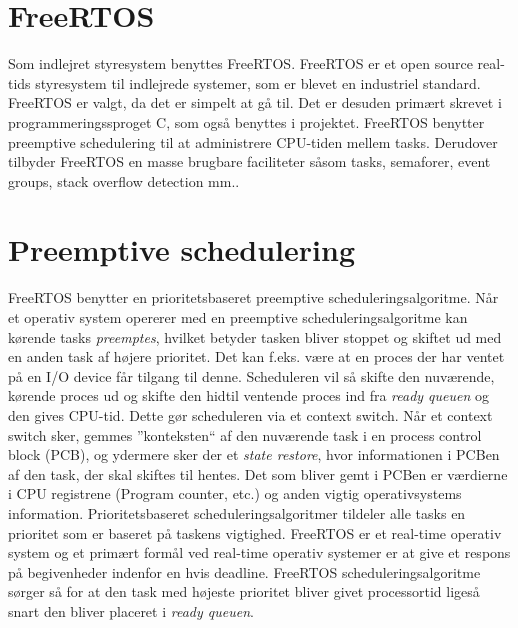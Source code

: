 \section{FreeRTOS}
Som indlejret styresystem benyttes FreeRTOS. 
FreeRTOS er et open source real-tids styresystem til indlejrede systemer, som er blevet en industriel standard\cite{FreeRTOSfundamentals}. 
FreeRTOS er valgt, da det er simpelt at gå til. 
Det er desuden primært skrevet i programmeringssproget C, som også benyttes i projektet. 
FreeRTOS benytter preemptive schedulering til at administrere CPU-tiden mellem tasks.
Derudover tilbyder FreeRTOS en masse brugbare faciliteter såsom tasks, semaforer, event groups, stack overflow detection mm.\cite[Features Overview]{FreeRTOSfundamentals}.

\section{Preemptive schedulering}
FreeRTOS benytter en prioritetsbaseret preemptive scheduleringsalgoritme.
Når et operativ system opererer med en preemptive scheduleringsalgoritme kan kørende tasks \textit{preemptes}, hvilket betyder tasken bliver stoppet og skiftet ud med en anden task af højere prioritet.\newline
Det kan f.eks. være at en proces der har ventet på en I/O device får tilgang til denne.
Scheduleren vil så skifte den nuværende, kørende proces ud og skifte den hidtil ventende proces ind fra \textit{ready queuen} og den gives CPU-tid.
Dette gør scheduleren via et context switch.
Når et context switch sker, gemmes ''konteksten`` af den nuværende task i en process control block (PCB), og ydermere sker der et \textit{state restore}, hvor informationen i PCBen af den task, der skal skiftes til hentes.
Det som bliver gemt i PCBen er værdierne i CPU registrene (Program counter, etc.) og anden vigtig operativsystems information.\newline
Prioritetsbaseret scheduleringsalgoritmer tildeler alle tasks en prioritet som er baseret på taskens vigtighed.\newline
FreeRTOS er et real-time operativ system og et primært formål ved real-time operativ systemer er at give et respons på begivenheder indenfor en hvis deadline.
FreeRTOS scheduleringsalgoritme sørger så for at den task med højeste prioritet bliver givet processortid ligeså snart den bliver placeret i \textit{ready queuen}.

